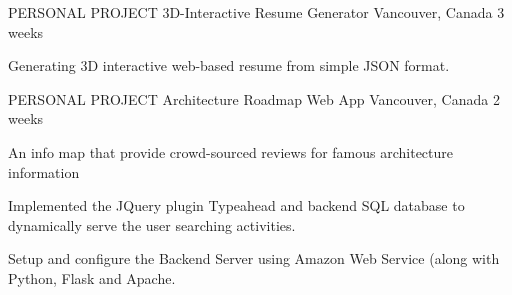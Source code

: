 

\begin{cventries}


  \cventry
    {PERSONAL PROJECT} %
    {3D-Interactive Resume Generator} %
    {Vancouver, Canada} %
    {3 weeks} %
    {
      \begin{cvitems} %
        \item {Generating 3D interactive web-based resume from simple JSON format.}
      \end{cvitems}
    }

  \cventry
    {PERSONAL PROJECT} %
    {Architecture Roadmap Web App} %
    {Vancouver, Canada} %
    {2 weeks} %
    {
      \begin{cvitems} %
        \item {An info map that provide crowd-sourced reviews for famous architecture information}
        \item {Implemented the JQuery plugin Typeahead and backend SQL database to dynamically serve the user searching activities.}
        \item {Setup and configure the Backend Server using Amazon Web Service (along with Python, Flask and Apache.}
      \end{cvitems}
    }



\end{cventries}
